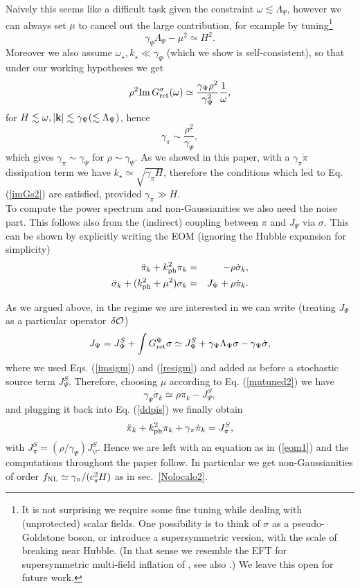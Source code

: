 \documentclass[11pt,amsmath,floats,floatfix,nofootinbib,secnumarabic, superscriptaddress, tightenlines]{revtex4}
\newcommand{\beq}{\begin{equation}}
\newcommand{\eeq}{\end{equation}}
\newcommand{\bea}{\begin{eqnarray}}
\newcommand{\eea}{\end{eqnarray}}
\newcommand{\calo}{{\cal O}}
\begin{document}
{Naively this seems like a difficult task given the constraint $\omega\lesssim \Lambda_\Psi$, however we can always set $\mu$ to cancel out the large contribution, for example by tuning\footnote{It is not surprising we require some fine tuning while dealing with (unprotected) scalar fields. One possibility is to think of $\sigma$ as a pseudo-Goldstone boson, or introduce a supersymmetric version, with the scale of breaking near Hubble. (In that sense we resemble the EFT for supersymmetric multi-field inflation of \cite{multieft}, see also \cite{dan2new}.) We leave this open for future work.}
\beq
\label{mutuned}
\gamma_\Psi \Lambda_\Psi - \mu^2 \simeq H^2.
\eeq
Moreover we also assume $\omega_\star, k_\star \ll \gamma_\Psi$ (which we show is self-consistent), so that under our working hypotheses we get
\beq
\label{imGs2}
\rho^2 {\rm Im}\, G^\sigma_{\rm ret}(\omega) \simeq  \frac{\gamma_\Psi \rho^2}{\gamma_\Psi^2}\frac{1}{\omega},
\eeq
for $H \lesssim  \omega, |{\bf k}| \lesssim \gamma_\Psi (\lesssim \Lambda_\Psi)$, hence
\beq
\gamma_\pi \sim \frac{\rho^2}{\gamma_\Psi},
\eeq
which gives $\gamma_\pi \sim \gamma_\Psi$ for $\rho \sim \gamma_\Psi$. As we showed in this paper, with a $\gamma_\pi\dot\pi$ dissipation term we have $k_\star \simeq \sqrt{\gamma_\pi H}$, therefore the conditions which led to Eq. (\ref{imGs2}) are satisfied, provided $\gamma_\pi \gg H$.\\

To compute the power spectrum and non-Gaussianities we also need the noise part. This follows also from the (indirect) coupling between $\pi$ and $J_\Psi$ via $\sigma$. This can be shown by explicitly writing the EOM (ignoring the Hubble expansion for simplicity)
\bea
\label{ddpis}\ddot\pi_k + k_{\rm ph}^2\pi_k &=& -\rho\dot\sigma_k, \\
\label{ddsig}\ddot\sigma_k + (k_{\rm ph}^2+\mu^2)\sigma_k &=& J_\Psi + \rho\dot\pi_k.
\eea


As we argued above, in the regime we are interested in we can write (treating $J_\Psi$ as a particular operator~$\delta\calo$)
\beq
J_\Psi =  J^S_\Psi + \int G^\Psi_{\rm ret} \sigma \simeq J^S_\Psi +\gamma_\Psi\Lambda_\Psi\sigma - \gamma_\Psi\dot\sigma,
\eeq
where we used Eqs. (\ref{imsigm}) and (\ref{resigm}) and added as before a stochastic source term $J^S_\Psi$. Therefore, choosing $\mu$ according to Eq. (\ref{mutuned2}) we have
\beq
 \gamma_\Psi\dot\sigma_k \simeq \rho\dot \pi_k - J^S_\Psi,
\eeq
and plugging it back into Eq. (\ref{ddpis}) we finally obtain
\beq
\ddot\pi_k + k_{\rm ph}^2\pi_k +\gamma_\pi \dot\pi_k = J^S_\pi,
\eeq
with $J^S_\pi =\left(\rho/\gamma_\Psi\right) J^S_\psi$. Hence we are left with an equation as in (\ref{eom1}) and the computations throughout the paper follow. In particular we get non-Gaussianities of order $f_{\rm NL} \simeq \gamma_\pi/(c_s^2 H)$ as in sec.~\ref{Nolocalo2}.\\

}
\end{document}
